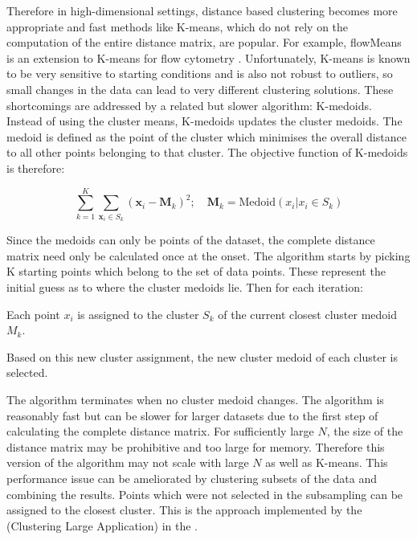 Therefore in high-dimensional settings, distance based clustering becomes more appropriate and
fast methods like K-means, which do not rely on the computation of the entire distance matrix, are popular.
For example, flowMeans is an extension to K-means for flow cytometry \citep{Aghaeepour:2010fv}.
Unfortunately, K-means is known to be very sensitive to starting conditions and is also not robust to outliers,
so small changes in the data can lead to very different clustering solutions.
These shortcomings are addressed by a related but slower algorithm: K-medoids.
Instead of using the cluster means, K-medoids updates the cluster medoids.
The medoid is defined as the point of the cluster which minimises the overall distance
to all other points belonging to that cluster.
The objective function of K-medoids is therefore:

\[
    \sum_{k=1}^{K} \sum_{\mathbf x_i \in S_k} ( \mathbf x_i - \boldsymbol M_k )^2 ; \quad \boldsymbol M_k=\text{Medoid}(x_i| x_i \in S_k)
\]

Since the medoids can only be points of the dataset, the complete distance matrix need only be calculated once at the onset.
The algorithm starts by picking K starting points which belong to the set of data points.
These represent the initial guess as to where the cluster medoids lie.
Then for each iteration:
\begin{itemise}
    \item Each point $x_i$ is assigned to the cluster $S_k$ of the current closest cluster medoid $M_k$.
    \item Based on this new cluster assignment, the new cluster medoid of each cluster is selected.
\end{itemise}
The algorithm terminates when no cluster medoid changes.
The algorithm is reasonably fast but can be slower for larger datasets due to the first step of calculating the complete distance matrix.
For sufficiently large $N$, the size of the distance matrix may be prohibitive and too large for memory.
Therefore this version of the algorithm may not scale with large $N$ as well as K-means. 
This performance issue can be ameliorated by clustering subsets of the data and combining the results.
Points which were not selected in the subsampling can be assigned to the closest cluster. 
This is the approach implemented by the  (Clustering Large Application) in the .

